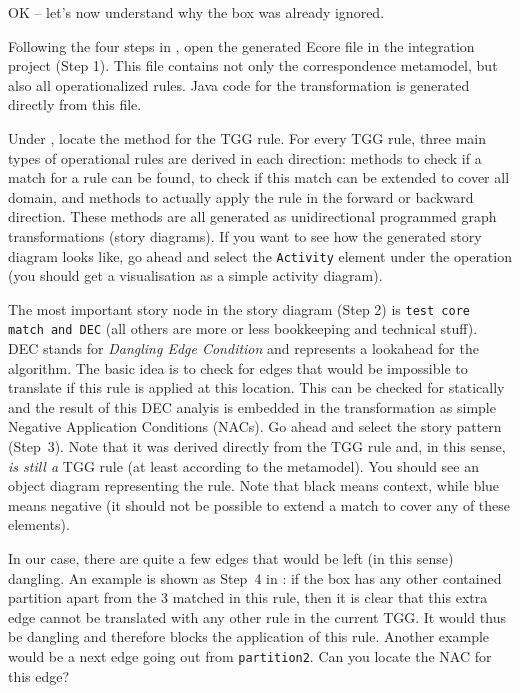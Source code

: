 OK -- let's now understand why the box was already ignored.

\begin{stepbystep}
\item Following the four steps in , open the generated Ecore file in the integration project (Step 1).
This file contains not only the correspondence metamodel, but also all operationalized rules.
Java code for the transformation is generated directly from this file.
\item Under , locate the  method for the TGG rule.
For every TGG rule, three main types of operational rules are derived in each direction:   methods to check if a match for a rule can be found,  to check if this match can be extended to cover all domain, and  methods to actually apply the rule in the forward or backward direction.
These methods are all generated as unidirectional programmed graph transformations (story diagrams).
If you want to see how the generated story diagram looks like, go ahead and select the \texttt{Activity} element under the operation (you should get a visualisation as a simple activity diagram).
\item The most important story node in the story diagram (Step 2) is \texttt{test core match and DEC} (all others are more or less bookkeeping and technical stuff).
DEC stands for \emph{Dangling Edge Condition} and represents a lookahead for the algorithm.
The basic idea is to check for edges that would be impossible to translate if this rule is applied at this location.
This can be checked for statically and the result of this DEC analyis is embedded in the transformation as simple Negative Application Conditions (NACs). 
Go ahead and select the story pattern (Step~3).
Note that it was derived directly from the TGG rule and, in this sense, \emph{is still a} TGG rule (at least according to the metamodel).
You should see an object diagram representing the rule.
Note that black means context, while blue means negative (it should not be possible to extend a match to cover any of these elements).

\item In our case, there are quite a few edges that would be left (in this sense) dangling.
An example is shown as Step~4 in :  if the box has any other contained partition apart from the 3 matched in this rule, then it is clear that this extra edge cannot be translated with any other rule in the current TGG.
It would thus be dangling and therefore blocks the application of this rule.
Another example would be a next edge going out from \texttt{partition2}.
Can you locate the NAC for this edge?
\end{stepbystep}

